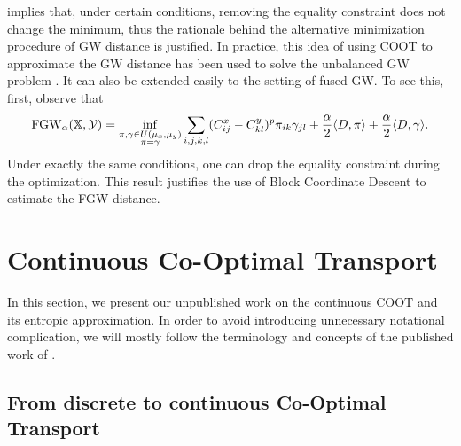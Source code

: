  implies that, under certain conditions, removing
the equality constraint does not change the minimum,
thus the rationale behind the alternative minimization procedure of GW distance is justified.
In practice, this idea of using COOT to approximate the GW distance has been used to
solve the unbalanced GW problem \citep{Sejourne20,Thual22}. It can also be extended
easily to the setting of fused GW. To see this, first, observe that
\begin{align}
  \text{FGW}_{\alpha}(\mathbb X, \mathcal Y) =
  \inf_{\substack{\pi, \gamma \in U(\mu_x, \mu_y) \\ \pi = \gamma }}
  \sum_{i,j,k,l} (C^x_{ij} - C^y_{kl})^p \pi_{ik} \gamma_{jl} +
  \frac{\alpha}{2} \langle D, \pi \rangle + \frac{\alpha}{2} \langle D, \gamma \rangle.
\end{align}
Under exactly the same conditions, one can drop the equality constraint during the optimization.
This result justifies the use of Block Coordinate Descent to estimate the FGW distance.

\section{Continuous Co-Optimal Transport}

In this section, we present our unpublished work on the continuous COOT and its entropic approximation.
In order to avoid introducing unnecessary notational complication,
we will mostly follow the terminology and concepts of the published work of \citep{Chowdhury21b}.

\subsection{From discrete to continuous Co-Optimal Transport}

